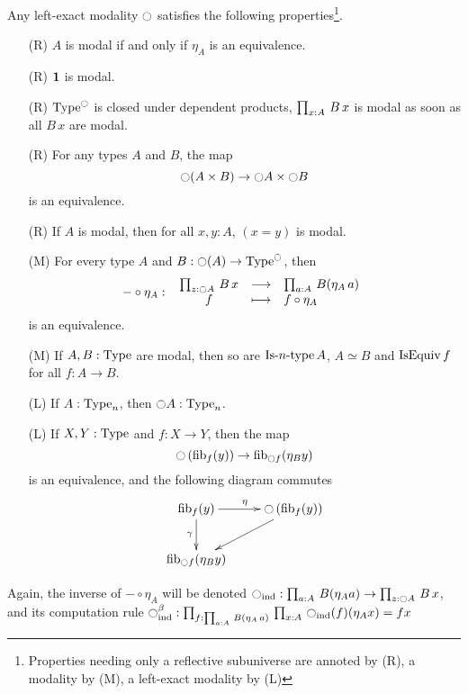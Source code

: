 \begin{prop}\label{prop:mod_prop}
  Any left-exact modality $\ocircle$ satisfies the following
  properties\footnote{Properties needing only a reflective subuniverse
    are annoted by (R), a modality by (M), a left-exact modality by (L)}.
  \begin{itemize}
  \item[\labelitemi(R)] $A$ is modal if and only if $\eta_A$ is an equivalence.
  \item[\labelitemi(R)] $\mathbf{1}$ is modal.
  \item[\labelitemi(R)] $\operatorname{Type}^{\ocircle}$ is closed under dependent
    products, \ie{} $\prod_{x:A}\, B\, x$ is modal as soon as all $B\,
    x$ are modal.
  \item[\labelitemi(R)] For any types $A$ and $B$, the map
    \[ \ocircle(A\times B) \to \ocircle A \times\ocircle B \]
    is an equivalence.
  \item[\labelitemi(R)] If $A$ is modal, then for all $x,y:A$, $(x=y)$
    is modal.
  \item[\labelitemi(M)] For every type $A$ and $B:\ocircle(A)\to\operatorname{Type}^{\ocircle}$, then
    \[ -\circ\eta_A \, \colon \left. \begin{array}{ccl} \prod_{z:\ocircle A}\, B\, x & \longrightarrow & \prod_{a:A}\, B(\eta_A\, a) \\ f & \longmapsto & f\circ \eta_A \end{array} \right. \]
    is an equivalence.
  \item[\labelitemi(M)] If $A,B:\operatorname{Type}$ are modal, then so are $\mathop{\mathrm{Is{\hbox{-}}}n\mathrm{{\hbox{-}} type}} A$, $A\simeq B$ and $\operatorname{IsEquiv} f$ for all $f:A\to B$.
  \item[\labelitemi(L)] If $A:\operatorname{Type}_n$, then $\ocircle A:\operatorname{Type}_n$.
  \item[\labelitemi(L)] If $X,Y:\operatorname{Type}$ and $f:X\to Y$, then the map
    \[ \ocircle \left( \mathrm{fib}_{f}(y)\right) \to \mathrm{fib}_{\ocircle f}(\eta_B
        y) \]
    is an equivalence, and the following diagram commutes
\[ \xymatrix{
  \fib f y \ar[r]^\eta \ar[d]_\gamma & \modal \left(\fib f y \right) \ar[dl]\\
  \fib{\modal f}{\eta_B y} & }\] 
  \end{itemize}
\end{prop}

\begin{nota}
  Again, the inverse of $- \circ \eta_A$ will be denoted
  $\ocircle_{\mathrm{ind}} : \prod_{a:A}\, B (\eta_A a) \to \prod_{z:\ocircle A}\, B\, x$, and its computation rule
  $\ocircle_{\mathrm{ind}}^\beta : \prod_{f:\prod_{a:A}\, B(\eta_A\, a)}\, \prod_{x:A}\, \ocircle_{\mathrm{ind}}(f)(\eta_A x) = f x$
\end{nota}

